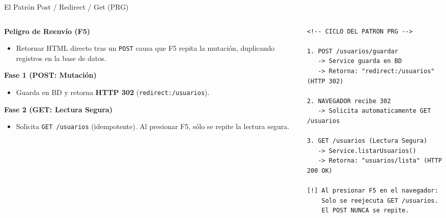 \documentclass[aspectratio=169]{beamer}
\begin{document}
\begin{frame}[fragile]{El Patr\'on Post / Redirect / Get (PRG)}
\begin{columns}[c]
\begin{column}{0.48\textwidth}
  \textbf{Peligro de Reenv\'io (F5)}
  \begin{itemize}
    \item Retornar HTML directo tras un \texttt{POST} causa que F5 repita la mutaci\'on, duplicando registros en la base de datos.
  \end{itemize}
  \vspace{2pt}
  \textbf{Fase 1 (POST: Mutaci\'on)}
  \begin{itemize}
    \item Guarda en BD y retorna \textbf{HTTP 302} (\texttt{redirect:/usuarios}).
  \end{itemize}
  \vspace{2pt}
  \textbf{Fase 2 (GET: Lectura Segura)}
  \begin{itemize}
    \item Solicita \texttt{GET /usuarios} (idempotente). Al presionar F5, s\'olo se repite la lectura segura.
  \end{itemize}
\end{column}
\begin{column}{0.50\textwidth}
\begin{lstlisting}[style=ThymeleafStyle]
<!-- CICLO DEL PATRON PRG -->

1. POST /usuarios/guardar
   -> Service guarda en BD
   -> Retorna: "redirect:/usuarios" (HTTP 302)

2. NAVEGADOR recibe 302
   -> Solicita automaticamente GET /usuarios

3. GET /usuarios (Lectura Segura)
   -> Service.listarUsuarios()
   -> Retorna: "usuarios/lista" (HTTP 200 OK)

[!] Al presionar F5 en el navegador:
    Solo se reejecuta GET /usuarios.
    El POST NUNCA se repite.
\end{lstlisting}
\end{column}
\end{columns}
\end{frame}
\end{document}
